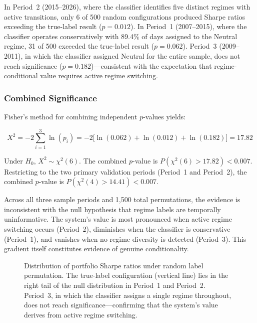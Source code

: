 \documentclass[12pt]{article}
\begin{document}
In Period~2 (2015--2026), where the classifier identifies five distinct regimes with active transitions, only 6 of 500 random configurations produced Sharpe ratios exceeding the true-label result ($p = 0.012$).
In Period~1 (2007--2015), where the classifier operates conservatively with 89.4\% of days assigned to the Neutral regime, 31 of 500 exceeded the true-label result ($p = 0.062$).
Period~3 (2009--2011), in which the classifier assigned Neutral for the entire sample, does not reach significance ($p = 0.182$)---consistent with the expectation that regime-conditional value requires active regime switching.

\subsubsection{Combined Significance}

Fisher's method for combining independent $p$-values yields:

\begin{equation}
    X^2 = -2 \sum_{i=1}^{3} \ln(p_i) = -2\bigl[\ln(0.062) + \ln(0.012) + \ln(0.182)\bigr] = 17.82
\end{equation}

\noindent
Under $H_0$, $X^2 \sim \chi^2(6)$.
The combined $p$-value is $P(\chi^2(6) > 17.82) < 0.007$.
Restricting to the two primary validation periods (Period~1 and Period~2), the combined $p$-value is $P(\chi^2(4) > 14.41) < 0.007$.

Across all three sample periods and 1{,}500 total permutations, the evidence is inconsistent with the null hypothesis that regime labels are temporally uninformative.
The system's value is most pronounced when active regime switching occurs (Period~2), diminishes when the classifier is conservative (Period~1), and vanishes when no regime diversity is detected (Period~3).
This gradient itself constitutes evidence of genuine conditionality.

\begin{figure}[H]
\centering
{}
\caption{Distribution of portfolio Sharpe ratios under random label permutation. The true-label configuration (vertical line) lies in the right tail of the null distribution in Period~1 and Period~2. Period~3, in which the classifier assigns a single regime throughout, does not reach significance---confirming that the system's value derives from active regime switching.}
\label{fig:shuffle}
\end{figure}
\end{document}
